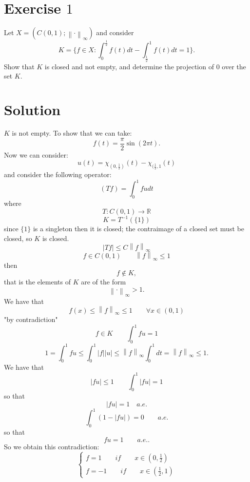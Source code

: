 \documentclass[a4paper, twoside, openany]{book}
\newcommand{\norm}[1]{\left\lVert#1\right\rVert}
\begin{document}
\section*{Exercise $1$}
Let $X = (C(0,1); \norm{ \cdot }_{\infty})$ and consider
$$K = \{ f \in X : \int_0^{\frac{1}{2}} f(t) dt - \int_{\frac{1}{2}}^1 f(t) dt = 1 \}.$$
Show that $K$ is closed and not empty, and determine the projection of $0$ over the set $K$.
\section*{Solution}
$K$ is not empty. To show that we can take:
$$f(t) = \frac{\pi}{2} \sin(2 \pi t).$$
Now we can consider:
$$u(t) = \chi_{(0, \frac{1}{2})}(t) - \chi_{(\frac{1}{2}, 1}(t)$$
and consider the following operator:
$$(Tf) = \int_0^1 f u dt$$
where
$$T: C(0, 1) \rightarrow \mathbb{R}$$
$$K = T^{-1}(\{ 1 \})$$
since $\{ 1 \}$ is a singleton then it is closed; the contraimage of a closed set must be closed, so $K$ is closed.
$$|Tf| \leq C \norm{f}_{\infty}$$
$$f \in C(0, 1) \qquad \norm{f}_{\infty} \leq 1$$
then
$$f \notin K,$$
that is the elements of $K$ are of the form
$$\norm{ \cdot }_{\infty} > 1.$$
We have that 
$$f(x) \leq \norm{f}_{\infty} \leq 1 \qquad \forall x \in (0, 1)$$
"by contradiction"
$$f \in K \qquad \int_0^1 f u = 1$$
$$1 = \int_0^1 f u \leq \int_0^1 |f| |u| \leq \norm{f}_{\infty} \int_0^1 dt = \norm{f}_{\infty} \leq 1.$$
We have that
$$|f u| \leq 1 \qquad \int_0^1 |f u| = 1$$
so that
$$| f u | = 1 \quad a.e.$$
$$\int_0^1( 1 - | f u|) = 0 \qquad a.e.$$
so that
$$f u = 1 \qquad a.e. .$$
So we obtain this contradiction:
$$\begin{cases}
		f = 1 \qquad if \qquad x \in (0, \frac{1}{2}) \\
		f = -1 \qquad if \qquad x \in (\frac{1}{2}, 1)
  \end{cases}
$$
\begin{figure}[!ht]
\begin{center}
\end{center}
\end{figure}
\end{document}

